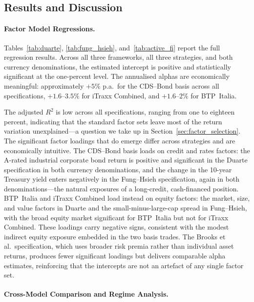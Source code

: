 
\subsection{Results and Discussion}
\label{sec:bench_results}

\paragraph{Factor Model Regressions.}

Tables~\ref{tab:duarte}, \ref{tab:fung_hsieh}, and~\ref{tab:active_fi}
report the full regression results. Across all three frameworks, all
three strategies, and both currency denominations, the estimated
intercept is positive and statistically significant at the one-percent
level. The annualised alphas are economically meaningful:
approximately $+5\%$ p.a.\ for the CDS--Bond basis across all
specifications, $+1.6$--$3.5\%$ for iTraxx Combined, and
$+1.6$--$2\%$ for BTP~Italia.

The adjusted $R^2$ is low across all specifications, ranging from one
to eighteen percent, indicating that the standard factor sets leave
most of the return variation unexplained---a question we take up in
Section~\ref{sec:factor_selection}. The significant factor loadings that do emerge differ across
strategies and are economically intuitive. The CDS--Bond basis loads
on credit and rates factors: the A-rated industrial corporate bond
return is positive and significant in the Duarte specification in both
currency denominations, and the change in the 10-year Treasury yield
enters negatively in the Fung--Hsieh specification, again in both
denominations---the natural exposures of a long-credit, cash-financed
position. BTP~Italia and iTraxx Combined load instead on equity
factors: the market, size, and value factors in Duarte and the
small-minus-large-cap spread in Fung--Hsieh, with the broad equity
market significant for BTP~Italia but not for iTraxx Combined. These
loadings carry negative signs, consistent with the modest indirect
equity exposure embedded in the two basis trades. The Brooks et al.\ specification,
which uses broader risk premia rather than individual asset returns,
produces fewer significant loadings but delivers comparable alpha estimates,
reinforcing that the intercepts are not an artefact of any single factor set.

\paragraph{Cross-Model Comparison and Regime Analysis.}

